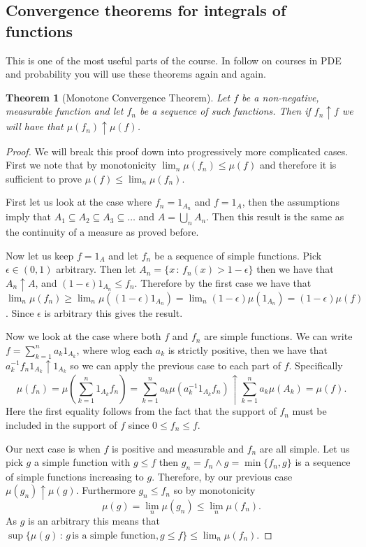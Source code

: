 \documentclass[11pt]{article}
\newtheorem{thm}{Theorem}[section]
\theoremstyle{definition}
\theoremstyle{remark}
\begin{document}
\subsection{Convergence theorems for integrals of functions}
This is one of the most useful parts of the course. In follow on courses in PDE and probability you will use these theorems again and again.
\begin{thm}[Monotone Convergence Theorem]
Let $f$ be a non-negative, measurable function and let $f_n$ be a sequence of such functions. Then if $f_n \uparrow f$ we will have that $\mu(f_n) \uparrow \mu(f)$.
\end{thm}
\begin{proof}
We will break this proof down into progressively more complicated cases. First we note that by monotonicity $\lim_n \mu(f_n) \leq \mu(f)$ and therefore it is sufficient to prove $\mu(f) \leq \lim_n \mu(f_n)$.

First let us look at the case where $f_n = 1_{A_n}$ and $f=1_{A}$, then the assumptions imply that $A_1 \subseteq A_2 \subseteq A_3 \subseteq \dots$ and $A= \bigcup_n A_n$. Then this result is the same as the continuity of a measure as proved before.

Now let us keep $f=1_{A}$ and let $f_n$ be a sequence of simple functions. Pick $\epsilon \in (0,1)$ arbitrary. Then let $A_n = \{ x\,:\, f_n(x)>1-\epsilon\}$ then we have that $A_n \uparrow A$, and $(1-\epsilon)1_{A_n} \leq f_n$. Therefore by the first case we have that $\lim_n \mu(f_n) \geq \lim_n \mu((1-\epsilon)1_{A_n}) = \lim_n (1-\epsilon) \mu(1_{A_n}) = (1-\epsilon) \mu(f)$. Since $\epsilon$ is arbitrary this gives the result.

Now we look at the case where both $f$ and $f_n$ are simple functions. We can write $f = \sum_{k=1}^n a_k 1_{A_k}$, where wlog each $a_k$ is strictly positive, then we have that $a_k^{-1} f_n 1_{A_k} \uparrow 1_{A_k}$ so we can apply the previous case to each part of $f$. Specifically
\[ \mu(f_n) = \mu(\sum_{k=1}^n  1_{A_k}f_n) = \sum_{k=1}^n a_k \mu (a_k^{-1} 1_{A_k}f_n) \uparrow \sum_{k=1}^n a_k \mu(A_k) = \mu(f). \] Here the first equality follows from the fact that the support of $f_n$ must be included in the support of $f$ since $0 \leq f_n \leq f$.

Our next case is when $f$ is positive and measurable and $f_n$ are all simple. Let us pick $g$ a simple function with $g \leq f$ then $g_n = f_n \wedge g = \min\{f_n, g\}$ is a sequence of simple functions increasing to $g$. Therefore, by our previous case $\mu(g_n) \uparrow \mu(g)$. Furthermore $g_n \leq f_n$ so by monotonicity \[ \mu(g) =\lim_n \mu(g_n) \leq \lim_n \mu(f_n).\] As $g$ is an arbitrary this means that $\sup\{\mu(g)\,:\, g \, \mbox{is a simple function}, g \leq f\} \leq \lim_n \mu(f_n).$


\end{proof}
\end{document}
